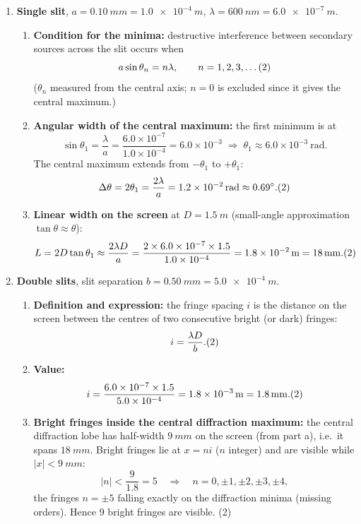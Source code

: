 \documentclass[11pt]{article}
\begin{document}
\begin{corrige}
\begin{enumerate}
\item \textbf{Single slit}, $a = \SI{0.10}{mm} = \SI{1.0e-4}{m}$, $\lambda = \SI{600}{nm} = \SI{6.0e-7}{m}$.
\begin{enumerate}
\item \textbf{Condition for the minima:} destructive interference between secondary sources across the slit occurs when
\[ a\sin\theta_n = n\lambda, \qquad n = 1, 2, 3, \dots \hfill (2) \]
($\theta_n$ measured from the central axis; $n = 0$ is excluded since it gives the central maximum.)
\item \textbf{Angular width of the central maximum:} the first minimum is at
\[ \sin\theta_1 = \frac{\lambda}{a} = \frac{6.0\times10^{-7}}{1.0\times10^{-4}} = 6.0\times10^{-3}
\;\Rightarrow\; \theta_1 \approx 6.0\times10^{-3}\ \mathrm{rad}. \]
The central maximum extends from $-\theta_1$ to $+\theta_1$:
\[ \Delta\theta = 2\theta_1 = \frac{2\lambda}{a} = \SI{1.2e-2}{rad} \approx 0.69^\circ. \hfill (2) \]
\item \textbf{Linear width on the screen} at $D = \SI{1.5}{m}$ (small-angle approximation $\tan\theta \approx \theta$):
\[ L = 2D\tan\theta_1 \approx \frac{2\lambda D}{a}
= \frac{2\times 6.0\times10^{-7}\times 1.5}{1.0\times10^{-4}}
= \SI{1.8e-2}{m} = \SI{18}{mm}. \hfill (2) \]
\end{enumerate}
\item \textbf{Double slits}, slit separation $b = \SI{0.50}{mm} = \SI{5.0e-4}{m}$.
\begin{enumerate}
\item \textbf{Definition and expression:} the fringe spacing $i$ is the distance on the screen between the centres of two consecutive bright (or dark) fringes:
\[ i = \frac{\lambda D}{b}. \hfill (2) \]
\item \textbf{Value:}
\[ i = \frac{6.0\times10^{-7}\times 1.5}{5.0\times10^{-4}} = \SI{1.8e-3}{m} = \SI{1.8}{mm}. \hfill (2) \]
\item \textbf{Bright fringes inside the central diffraction maximum:} the central diffraction lobe has half-width $\SI{9}{mm}$ on the screen (from part a), i.e.\ it spans $\SI{18}{mm}$. Bright fringes lie at $x = ni$ ($n$ integer) and are visible while $|x| < \SI{9}{mm}$:
\[ |n| < \frac{9}{1.8} = 5 \quad\Rightarrow\quad n = 0, \pm1, \pm2, \pm3, \pm4, \]
the fringes $n = \pm5$ falling exactly on the diffraction minima (missing orders). Hence $\boxed{9}$ bright fringes are visible. \hfill (2)

\end{enumerate}
\end{enumerate}
\end{corrige}
\end{document}
